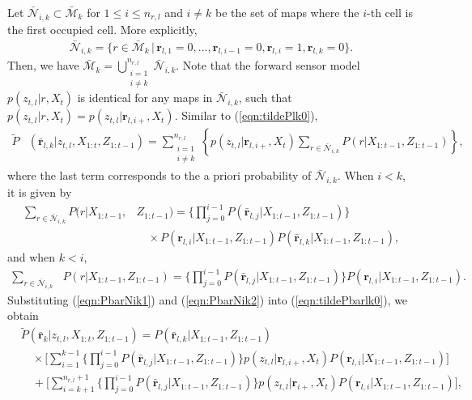 \documentclass[smallextended]{svjour3}       %
\newcommand{\braces}[1]{\ensuremath{\left\{ #1 \right\}}}
\newcommand{\refeqn}[1]{(\ref{eqn:#1})}
\begin{document}
Let $\bar{\mathcal{N}}_{i,k}\subset \bar{\mathcal{M}}_k $ for $1\leq i\leq n_{r,l}$ and $i\neq k$ be the set of maps where the $i$-th cell is the first occupied cell. More explicitly, 
\begin{align*}
\bar{\mathcal{N}}_{i,k}=\{r\in\bar{\mathcal{M}}_k\,|\, \mathbf{r}_{l,1}=0,\ldots,\mathbf{r}_{l,i-1}=0,
\mathbf{r}_{l,i}=1,\mathbf{r}_{l,k}=0\}.
\end{align*}
Then, we have $\bar{\mathcal{M}}_k=\bigcup_{\substack{i=1\\i\neq k}}^{n_{r,l}} \bar{\mathcal{N}}_{i,k}$. Note that the forward sensor model $p(z_{t,l}|r,X_t)$ is identical for any maps in $\bar{\mathcal{N}}_{i,k}$, such that $p(z_{t,l}|r,X_t)=p(z_{t,l}|\mathbf{r}_{l,i+},X_t)$. Similar to \refeqn{tildePlk0},
\begin{align}
\tilde P&(\bar{\mathbf{r}}_{l,k}|z_{t,l},X_{1:t},Z_{1:t-1})=\sum_{\substack{i=1\\i\neq k}}^{n_{r,l}} \braces{p(z_{t,l}|\mathbf{r}_{l,i+},X_t) \sum_{r\in\bar{\mathcal{N}}_{i,k}} P(r|X_{1:t-1},Z_{1:t-1})},\label{eqn:tildePbarlk0}
\end{align}
where the last term corresponds to the a priori probability of $\bar{\mathcal{N}}_{i,k}$. When $i<k$, it is given by
\begin{align}
\sum_{r\in\bar{\mathcal{N}}_{i,k}} P(r|X_{1:t-1},&Z_{1:t-1}) = \bigg\{\prod_{j=0}^{i-1}P(\bar{\mathbf{r}}_{l,j}|X_{1:t-1},Z_{1:t-1})\bigg\}\nonumber\\
&\quad \times P({\mathbf{r}}_{l,i}|X_{1:t-1},Z_{1:t-1})P(\bar{\mathbf{r}}_{l,k}|X_{1:t-1},Z_{1:t-1}),\label{eqn:PbarNik1}
\end{align}
and when $k<i$,
\begin{align}
\sum_{r\in\bar{\mathcal{N}}_{i,k}} & P(r|X_{1:t-1},Z_{1:t-1}) = \bigg\{\prod_{j=0}^{i-1}P(\bar{\mathbf{r}}_{l,j}|X_{1:t-1},Z_{1:t-1})\bigg\} P({\mathbf{r}}_{l,i}|X_{1:t-1},Z_{1:t-1}).\label{eqn:PbarNik2}
\end{align}
Substituting \refeqn{PbarNik1} and \refeqn{PbarNik2} into \refeqn{tildePbarlk0}, we obtain
\begin{align}
&\tilde P (\bar{\mathbf{r}}_k|z_{t,l},X_{1:t},Z_{1:t-1})
=P(\bar{\mathbf{r}}_{l,k}|X_{1:t-1},Z_{1:t-1})\nonumber\\
&\quad\times \bigg[\sum_{i=1}^{k-1}\bigg\{\prod_{j=0}^{i-1}P(\bar{\mathbf{r}}_{l,j}|X_{1:t-1},Z_{1:t-1})\bigg\}p(z_{t,l}|\mathbf{r}_{l,i+},X_t)P(\mathbf{r}_{l,i}|X_{1:t-1},Z_{1:t-1})\bigg]
\nonumber
\\
&\quad
+
\bigg[\sum_{i=k+1}^{n_{r,l}+1}\bigg\{\prod_{j=0}^{i-1}P(\bar{\mathbf{r}}_{l,j}|X_{1:t-1},Z_{1:t-1})\bigg\}p(z_{t,l}|\mathbf{r}_{i+},X_t)P(\mathbf{r}_{l,i}|X_{1:t-1},Z_{1:t-1})\bigg],\label{eqn:tildePbar}
\end{align}
\end{document}
